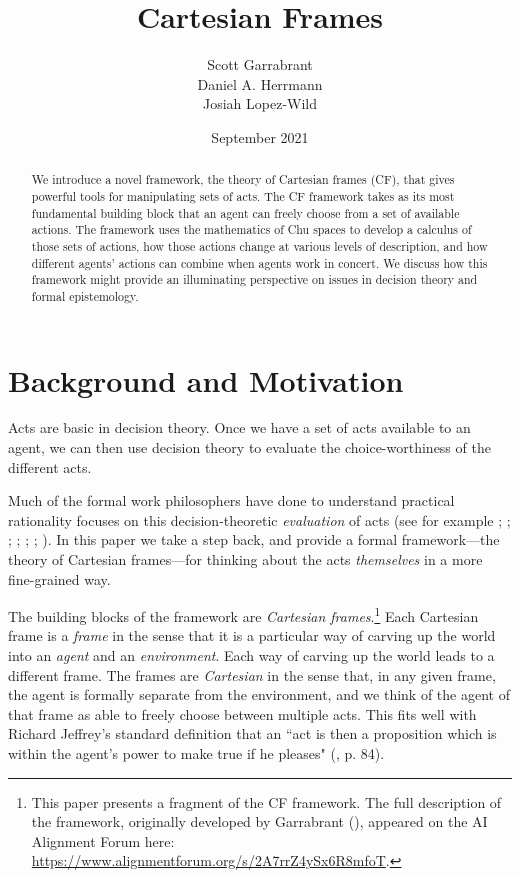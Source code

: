 \documentclass{article}
\title{Cartesian Frames}
\author{Scott Garrabrant \\ Daniel A. Herrmann \\ Josiah Lopez-Wild}
\date{September 2021}
\begin{document}
\maketitle

\begin{abstract}
    We introduce a novel framework, the theory of Cartesian frames (CF), that gives powerful tools for manipulating sets of acts. The CF framework takes as its most fundamental building block that an agent can freely choose from a set of available actions. The framework uses the mathematics of Chu spaces to develop a calculus of those sets of actions, how those actions change at various levels of description, and how different agents' actions can combine when agents work in concert. We discuss how this framework might provide an illuminating perspective on issues in decision theory and formal epistemology. 
    
\end{abstract}

\section{Background and Motivation}
\label{back}

Acts are basic in decision theory. Once we have a set of acts available to an agent, we can then use decision theory to evaluate the choice-worthiness of the different acts. 

Much of the formal work philosophers have done to understand practical rationality focuses on this decision-theoretic \textit{evaluation} of acts (see for example \cite{jeffrey1965logic};  \cite{nozick1969newcomb}; \cite{savage1972foundations}; \cite{skyrms1984pragmatics}; \cite{skyrms1990dynamics}; \cite{joyce1999foundations}; \cite{ahmed2014evidence}). In this paper we take a step back, and provide a formal framework---the theory of Cartesian frames---for thinking about the acts \textit{themselves} in a more fine-grained way. 

The building blocks of the framework are \textit{Cartesian frames}.\footnote{This paper presents a fragment of the CF framework. The full description of the framework, originally developed by Garrabrant (\citeyear{garrabrant2020cf}), appeared on the AI Alignment Forum here: \url{https://www.alignmentforum.org/s/2A7rrZ4ySx6R8mfoT}.} Each Cartesian frame is a \textit{frame} in the sense that it is a particular way of carving up the world into an \textit{agent} and an \textit{environment}. Each way of carving up the world leads to a different frame. The frames are \textit{Cartesian} in the sense that, in any given frame, the agent is formally separate from the environment, and we think of the agent of that frame as able to freely choose between multiple acts. This fits well with Richard Jeffrey's standard definition that an ``act is then a proposition which is within the agent's power to make true if he pleases" (\citeyear{jeffrey1965logic}, p. 84).
\end{document}
